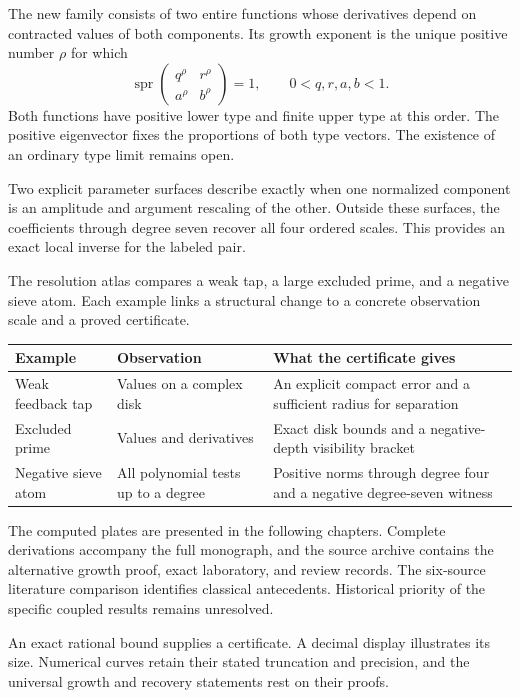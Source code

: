 The new family consists of two entire functions whose derivatives depend on
contracted values of both components. Its growth exponent is the unique
positive number $\rho$ for which
\[
\operatorname{spr}\begin{pmatrix}q^\rho&r^\rho\\a^\rho&b^\rho\end{pmatrix}=1,
\qquad 0<q,r,a,b<1.
\]
Both functions have positive lower type and finite upper type at this order.
The positive eigenvector fixes the proportions of both type vectors. The
existence of an ordinary type limit remains open.

Two explicit parameter surfaces describe exactly when one normalized component
is an amplitude and argument rescaling of the other. Outside these surfaces,
the coefficients through degree seven recover all four ordered scales. This
provides an exact local inverse for the labeled pair.

The resolution atlas compares a weak tap, a large excluded prime, and a negative
sieve atom. Each example links a structural change to a concrete observation
scale and a proved certificate.
\begin{center}
\renewcommand{\arraystretch}{1.35}
\begin{tabular}{@{}p{.22\linewidth}p{.31\linewidth}p{.39\linewidth}@{}}
\toprule
Example & Observation & What the certificate gives\\\midrule
Weak feedback tap & Values on a complex disk & An explicit compact error and a sufficient radius for separation\\
Excluded prime & Values and derivatives & Exact disk bounds and a negative-depth visibility bracket\\
Negative sieve atom & All polynomial tests up to a degree & Positive norms through degree four and a negative degree-seven witness\\
\bottomrule
\end{tabular}
\end{center}

The computed plates are presented in the following chapters.
Complete derivations accompany the full monograph, and the source archive
contains the alternative growth proof, exact laboratory, and review records.
The six-source literature comparison identifies classical antecedents.
Historical priority of the specific coupled results remains unresolved.

An exact rational bound supplies a certificate. A decimal display illustrates
its size. Numerical curves retain their stated truncation and precision, and
the universal growth and recovery statements rest on their proofs.
